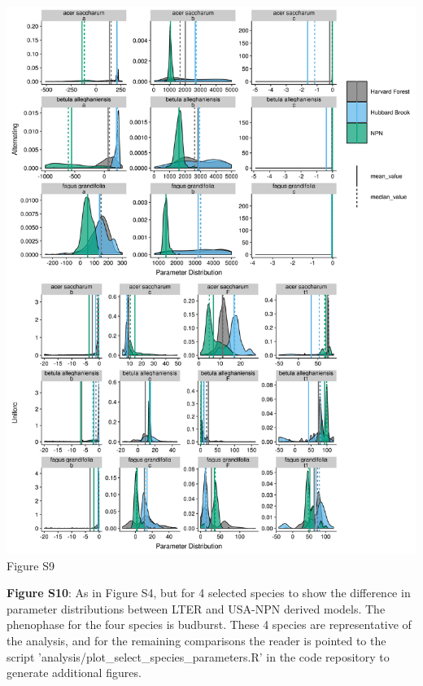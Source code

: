 \documentclass[a4paper,12pt]{article}
\begin{document}
\newpage

\begin{center}
	\centering
		\includegraphics[scale=0.5]{supplement_hubbard_harvard_comparison2.png}
	Figure S9
\end{center}

\newpage

\textbf{Figure S10}: As in Figure S4, but for 4 selected species to show the difference in parameter distributions between LTER and USA-NPN derived models. The phenophase for the four species is budburst. These 4 species are representative of the analysis, and for the remaining comparisons the reader is pointed to the script 'analysis/plot\_select\_species\_parameters.R' in the code repository to generate additional figures.

\newpage
\end{document}
